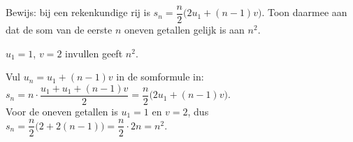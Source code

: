 \begin{oefeningen}
\begin{oefening}[3]
Bewijs: bij een rekenkundige rij is $s_n = \dfrac{n}{2}\bigl(2u_1 + (n-1)v\bigr)$. Toon daarmee aan dat de som van de eerste $n$ oneven getallen gelijk is aan $n^2$.
\begin{solution}
$u_1=1$, $v=2$ invullen geeft $n^2$.
\end{solution}
\begin{fullsolution}
Vul $u_n=u_1+(n-1)v$ in de somformule in: $s_n=n\cdot\dfrac{u_1+u_1+(n-1)v}{2}=\dfrac{n}{2}\bigl(2u_1+(n-1)v\bigr)$.\\
Voor de oneven getallen is $u_1=1$ en $v=2$, dus $s_n=\dfrac{n}{2}\bigl(2+2(n-1)\bigr)=\dfrac{n}{2}\cdot 2n=n^2$.
\end{fullsolution}
\end{oefening}
\end{oefeningen}



